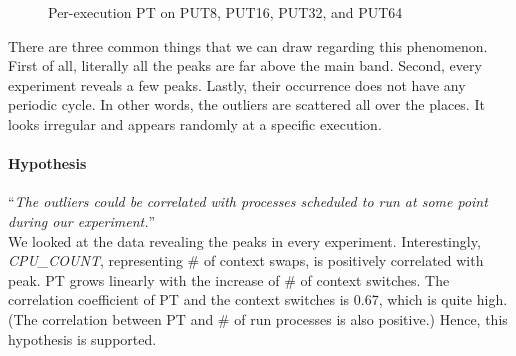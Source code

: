 \documentclass[10pt]{article}
\begin{document}
\begin{figure}[H]
{	}
	\caption{Per-execution PT on PUT8, PUT16, PUT32, and PUT64~\label{fig:peak_pt}}
\end{figure}

There are three common things that we can draw regarding this phenomenon. 
First of all, literally all the peaks are far above the main band. 
Second, every experiment reveals a few peaks. 
Lastly, their occurrence does not have any periodic cycle. In other words, 
the outliers are scattered all over the places. 
It looks irregular and appears randomly at a specific execution.

\paragraph{Hypothesis} ``{\it The outliers could be correlated with processes 
scheduled to run at some point during our experiment.}''\\

%
We looked at the data revealing the peaks in every experiment. 
Interestingly, {\em CPU\_COUNT}, representing \# of context swaps, is positively 
correlated with peak. PT grows linearly with the increase of \# of context switches. 
The correlation coefficient of PT and the context switches is 0.67, which is quite high. 
(The correlation between PT and \# of run processes is also positive.) 
Hence, this hypothesis is supported. 
\end{document}

